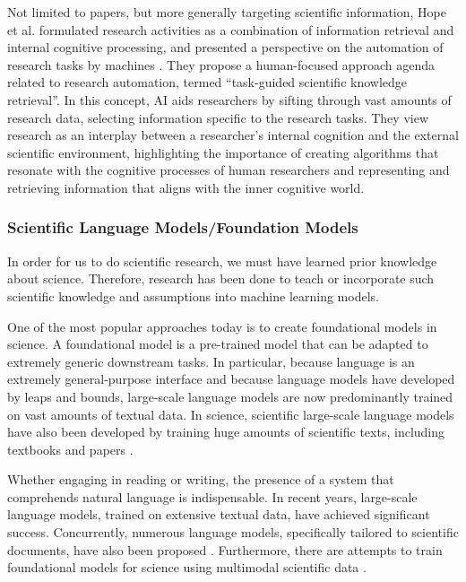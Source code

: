 Not limited to papers, but more generally targeting scientific information, Hope et al. formulated research activities as a combination of information retrieval and internal cognitive processing, and presented a perspective on the automation of research tasks by machines \cite{hope2022computational}. They propose a human-focused approach agenda related to research automation, termed ``task-guided scientific knowledge retrieval''. In this concept, AI aids researchers by sifting through vast amounts of research data, selecting information specific to the research tasks. They view research as an interplay between a researcher's internal cognition and the external scientific environment, highlighting the importance of creating algorithms that resonate with the cognitive processes of human researchers and representing and retrieving information that aligns with the inner cognitive world.

\subsubsection{Scientific Language Models/Foundation Models}
In order for us to do scientific research, we must have learned prior knowledge about science. Therefore, research has been done to teach or incorporate such scientific knowledge and assumptions into machine learning models.

One of the most popular approaches today is to create foundational models in science. A foundational model is a pre-trained model that can be adapted to extremely generic downstream tasks. In particular, because language is an extremely general-purpose interface and because language models have developed by leaps and bounds, large-scale language models are now predominantly trained on vast amounts of textual data. In science, scientific large-scale language models have also been developed by training huge amounts of scientific texts, including textbooks and papers \cite{taylor2022galactica}.


Whether engaging in reading or writing, the presence of a system that comprehends natural language is indispensable. In recent years, large-scale language models, trained on extensive textual data, have achieved significant success. Concurrently, numerous language models, specifically tailored to scientific documents, have also been proposed \cite{beltagy2019scibert,singh2022scirepeval,nadkarni2021scientific,cohan2020specter,gupta2022matscibert,taylor2022galactica}. Furthermore, there are attempts to train foundational models for science using multimodal scientific data \cite{singhal2023towards,takeda2023foundation,nguyen2023climax}.

